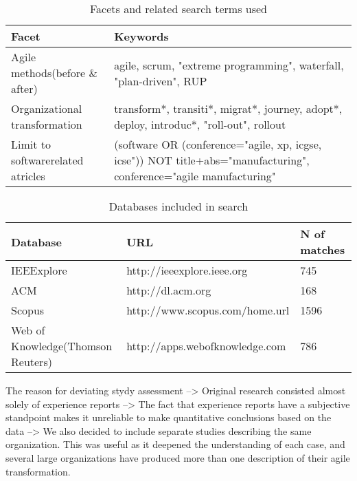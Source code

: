 \documentclass[preprint,authoryear,12pt]{elsarticle}
\begin{document}
\begin{table}
    \begin{tabular}{ p{} p{} }
        \toprule
        Facet                  & Keywords   \\
        \midrule
        Agile methods\newline (before \& after) &
            agile, scrum, "extreme programming",\newline
            waterfall, "plan-driven", RUP \\
        Organizational transformation &
            transform*, transiti*, migrat*, journey, adopt*, deploy, introduc*,
            "roll-out", rollout \\
        Limit to software\newline related atricles &
            (software OR (conference="agile, xp, icgse, icse"))\newline
            NOT title+abs="manufacturing", conference="agile manufacturing"
        \\
        \bottomrule
    \end{tabular}
    \caption{Facets and related search terms used}
    \label{table:searchterms}
\end{table}

\begin{table}
    \begin{tabular}{ p{} l l }
        \toprule
        Database      & URL                     & N of matches   \\
        \midrule
        IEEExplore    & http://ieeexplore.ieee.org      & 745 \\ 
        ACM           & http://dl.acm.org               & 168 \\
        Scopus        & http://www.scopus.com/home.url  & 1596 \\
        Web of Knowledge\newline(Thomson Reuters) &
        http://apps.webofknowledge.com & 786 \\
        \bottomrule
    \end{tabular}
    \caption{Databases included in search}
    \label{table:databases}
\end{table}


The reason for deviating stydy assessment
--> Original research consisted almost solely of experience reports
--> The fact that experience reports have a subjective standpoint makes it
    unreliable to make quantitative conclusions based on the data
--> We also decided to include separate studies describing the same organization.
    This was useful as it deepened the understanding of each case, and several
    large organizations have produced more than one description of their agile
    transformation.
\end{document}
